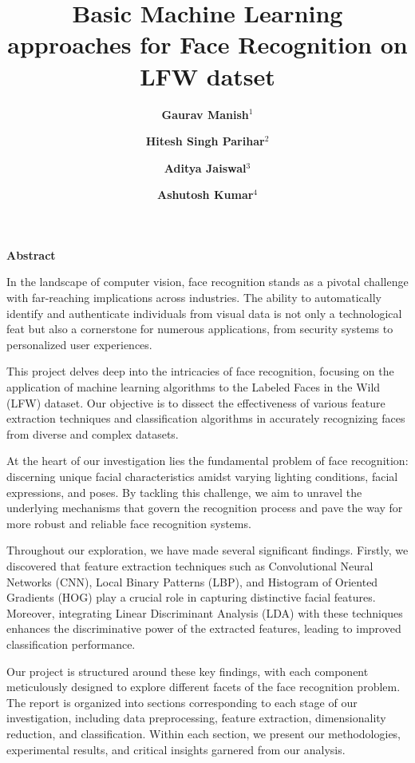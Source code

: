 \documentclass[a4paper]{article}
\title{\bfseries \huge Basic Machine Learning approaches for Face Recognition on LFW datset}
\author{\bfseries \Large Gaurav Manish$^1$\and \bfseries \Large Hitesh Singh Parihar$^2$ \and \bfseries \Large Aditya Jaiswal$^3$\and \bfseries \Large Ashutosh Kumar$^4$}
\date{ \bfseries \Large
	$^1$Indian Institute Of Technology,Jodhpur \\ \textbf{\{  b22cs079 , b22ee0089 , b22cs025 , b22cs015\}@iitj.ac.in}\\%
	\texttt
}
\theoremstyle{plain}
\theoremstyle{definition}
\renewenvironment{abstract}
 {\Large\textbf{Abstract}\vspace{0.5em}\par\noindent\ignorespaces}
 {\par\vspace{0.5em}}
\begin{document}
	\maketitle
	
	\begin  {abstract}
 \fontsize{15}{15}\selectfont 
 In the landscape of computer vision, face recognition stands as a pivotal challenge with far-reaching implications across industries. The ability to automatically identify and authenticate individuals from visual data is not only a technological feat but also a cornerstone for numerous applications, from security systems to personalized user experiences.\vspace{8pt}

This project delves deep into the intricacies of face recognition, focusing on the application of machine learning algorithms to the Labeled Faces in the Wild (LFW) dataset. Our objective is to dissect the effectiveness of various feature extraction techniques and classification algorithms in accurately recognizing faces from diverse and complex datasets.\vspace{8pt}

At the heart of our investigation lies the fundamental problem of face recognition: discerning unique facial characteristics amidst varying lighting conditions, facial expressions, and poses. By tackling this challenge, we aim to unravel the underlying mechanisms that govern the recognition process and pave the way for more robust and reliable face recognition systems.\vspace{8pt}

Throughout our exploration, we have made several significant findings. Firstly, we discovered that feature extraction techniques such as Convolutional Neural Networks (CNN), Local Binary Patterns (LBP), and Histogram of Oriented Gradients (HOG) play a crucial role in capturing distinctive facial features. Moreover, integrating Linear Discriminant Analysis (LDA) with these techniques enhances the discriminative power of the extracted features, leading to improved classification performance.\vspace{8pt}

Our project is structured around these key findings, with each component meticulously designed to explore different facets of the face recognition problem. The report is organized into sections corresponding to each stage of our investigation, including data preprocessing, feature extraction, dimensionality reduction, and classification. Within each section, we present our methodologies, experimental results, and critical insights garnered from our analysis.\vspace{8pt}


\end{abstract}
\end{document}
